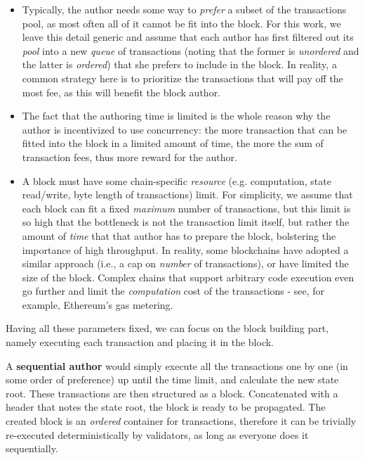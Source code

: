 \begin{itemize}
	\item Typically, the author needs some way to \textit{prefer} a subset of the transactions pool,
	as most often all of it cannot be fit into the block. For this work, we leave this detail
	generic and assume that each author has first filtered out its \textit{pool} into a new
	\textit{queue} of transactions (noting that the former is \textit{unordered} and the latter is
	\textit{ordered}) that she prefers to include in the block. In reality, a common strategy here
	is to prioritize the transactions that will pay off the most fee, as this will benefit the block
	author.
	\item The fact that the authoring time is limited is the whole reason why the author is
	incentivized to use concurrency: the more transaction that can be fitted into the block in a
	limited amount of time, the more the sum of transaction fees, thus more reward for the author.
	\item A block must have some chain-specific \textit{resource} (e.g. computation, state
	read/write, byte length of transactions) limit. For simplicity, we assume that each block can
	fit a fixed \textit{maximum} number of transactions, but this limit is so high that the
	bottleneck is not the transaction limit itself, but rather the amount of \textit{time} that that
	author has to prepare the block, bolstering the importance of high throughput. In reality, some
	blockchains have adopted a similar approach (i.e., a cap on \textit{number} of transactions), or
	have limited the size of the block. Complex chains that support arbitrary code execution even go
	further and limit the \textit{computation} cost of the transactions - see, for example,
	Ethereum's gas metering\cite{perezBrokenMetreAttacking2020}.
\end{itemize}

Having all these parameters fixed, we can focus on the block building part, namely executing
each transaction and placing it in the block.

A \textbf{sequential author} would simply execute all the transactions one by one (in some order of
preference) up until the time limit, and calculate the new state root. These transactions are then
structured as a block. Concatenated with a header that notes the state root, the block is ready to
be propagated. The created block is an \textit{ordered} container for transactions, therefore it can
be trivially re-executed deterministically by validators, as long as everyone does it sequentially.

